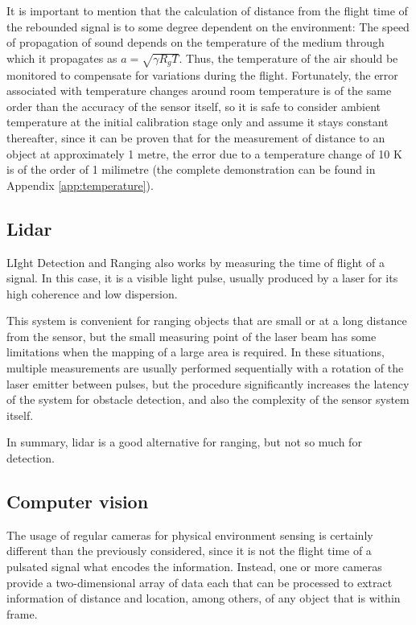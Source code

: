 It is important to mention that the calculation of distance from the flight time of the rebounded signal is to some degree dependent on the environment:
The speed of propagation of sound depends on the temperature of the medium through which it propagates as $a=\sqrt{\gamma R_g T}$.
Thus, the temperature of the air should be monitored to compensate for variations during the flight.
Fortunately, the error associated with temperature changes around room temperature is of the same order than the accuracy of the sensor itself, so it is safe to consider ambient temperature at the initial calibration stage only and assume it stays constant thereafter, since it can be proven that for the measurement of distance to an object at approximately 1 metre, the error due to a temperature change of 10 K is of the order of 1 milimetre (the complete demonstration can be found in Appendix \ref{app:temperature}).

\subsection{Lidar}

LIght Detection and Ranging also works by measuring the time of flight of a signal.
In this case, it is a visible light pulse, usually produced by a laser for its high coherence and low dispersion.

This system is convenient for ranging objects that are small or at a long distance from the sensor, but the small measuring point of the laser beam has some limitations when the mapping of a large area is required.
In these situations, multiple measurements are usually performed sequentially with a rotation of the laser emitter between pulses, but the procedure significantly increases the latency of the system for obstacle detection, and also the complexity of the sensor system itself.

In summary, lidar is a good alternative for ranging, but not so much for detection.

\subsection{Computer vision}

The usage of regular cameras for physical environment sensing is certainly different than the previously considered, since it is not the flight time of a pulsated signal what encodes the information.
Instead, one or more cameras provide a two-dimensional array of data each that can be processed to extract information of distance and location, among others, of any object that is within frame.

